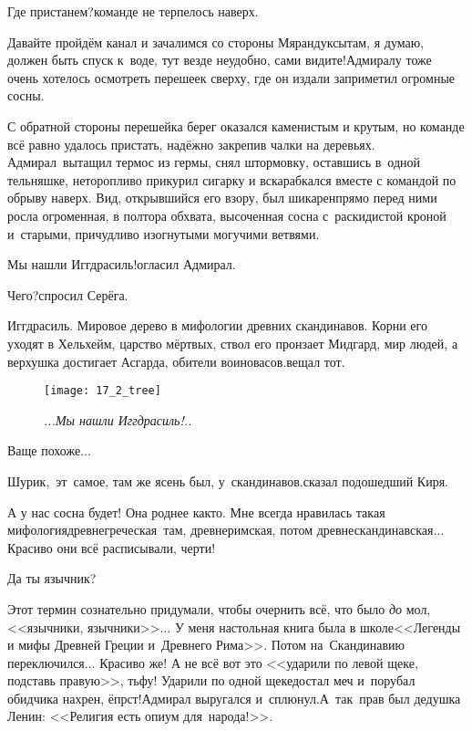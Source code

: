 \diagdash Где пристанем?\mdash команде не терпелось наверх.

\diagdash Давайте пройдём канал и зачалимся со стороны Мярандуксы\mdash там, я думаю, должен быть спуск к~воде, тут везде неудобно, сами видите!\mdash Адмиралу тоже очень хотелось осмотреть перешеек сверху, где он издали заприметил огромные сосны.

С обратной стороны перешейка берег оказался каменистым и крутым, но команде всё равно удалось пристать, надёжно закрепив чалки на деревьях. Адмирал~вытащил термос из гермы, снял штормовку, оставшись в~одной тельняшке, неторопливо прикурил сигарку и вскарабкался вместе с командой по обрыву наверх. Вид, открывшийся его взору, был шикарен\mdash прямо перед ними росла огроменная, в полтора обхвата, высоченная сосна с~раскидистой кроной и~старыми, причудливо изогнутыми могучими ветвями. %

\diagdash Мы нашли Иггдрасиль!\mdash огласил Адмирал.

\diagdash Чего?\mdash спросил Серёга.

\diagdash Иггдрасиль. Мировое дерево в мифологии древних скандинавов. Корни его уходят в Хельхейм, царство мёртвых, ствол его пронзает Мидгард, мир людей, а верхушка достигает Асгарда, обители воинов\sdash асов.\mdash вещал тот. 

\newpage

\begin{wrapfigure}[20]{r}{0.55\textwidth}
\centering
\texttt{[image: 17\_2\_tree]}
\caption{\small\textit{...Мы нашли Иггдрасиль!..}}
\end{wrapfigure}
\diagdash Ваще похоже$\ldots$

\diagdash Шурик,~эт~самое, там же ясень был, у~скандинавов.\mdash сказал подошедший Киря.

\diagdash А у нас сосна будет! Она роднее как\sdash то. Мне всегда нравилась такая мифология\mdash древнегреческая~там, древнеримская, потом древнескандинавская$\ldots$ Красиво они всё расписывали, черти!

\diagdash Да ты язычник?

\diagdash Этот термин сознательно придумали, чтобы очернить всё, что было {\textit{до} }\mdash мол, <<язычники, язычники>>$\ldots$ У меня настольная книга была в школе\mdash <<Легенды и мифы Древней Греции и~Древнего Рима>>\cite{Кун}. Потом на~Скандинавию переключился$\ldots$ Красиво же! А не всё вот это <<ударили по левой щеке, подставь правую>>, тьфу! Ударили по одной щеке\mdash достал меч и~порубал обидчика нахрен, ёпрст!\mdash Адмирал выругался и~сплюнул.\mdash А~так~прав был дедушка Ленин: <<Религия есть  опиум для~народа!>>\cite{ЛенинОпиумДляНарода}. 

